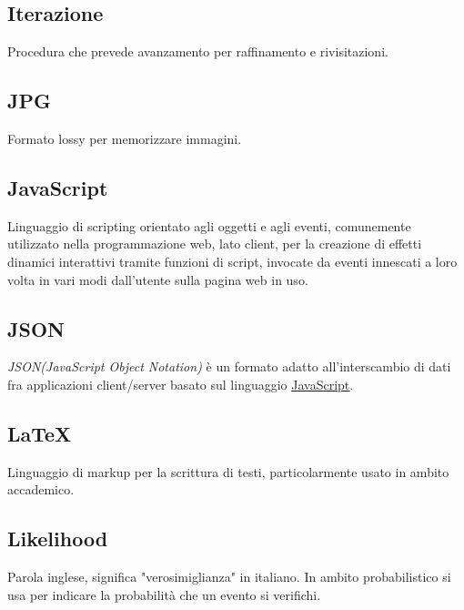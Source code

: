 	\subsection{Iterazione}
	\label{sec:iterazione}
	Procedura che prevede avanzamento per raffinamento e rivisitazioni.


	\newpage


	\subsection{JPG}
	\label{sec:jpg}
	Formato lossy per memorizzare immagini.


	\subsection{JavaScript}
	\label{sec:javascript}
	Linguaggio di scripting orientato agli oggetti e agli eventi, comunemente utilizzato nella programmazione web, lato client, per la creazione di effetti dinamici interattivi tramite funzioni di script, invocate da eventi innescati a loro volta in vari modi dall'utente sulla pagina web in uso.


	\subsection{JSON}
	\label{sec:json}
	\emph{JSON(JavaScript Object Notation)} è un formato adatto all'interscambio di dati fra applicazioni client/server basato sul linguaggio \underline{\hyperref[sec:javascript]{JavaScript}}.
	


	\newpage

	
	\subsection{LaTeX}
	\label{sec:latex}
	Linguaggio di markup per la scrittura di testi, particolarmente usato in ambito accademico.


	
	\subsection{Likelihood}
	\label{sec:likelihood}
	Parola inglese, significa "verosimiglianza" in italiano. In ambito probabilistico si usa per indicare la probabilità che un evento si verifichi.

